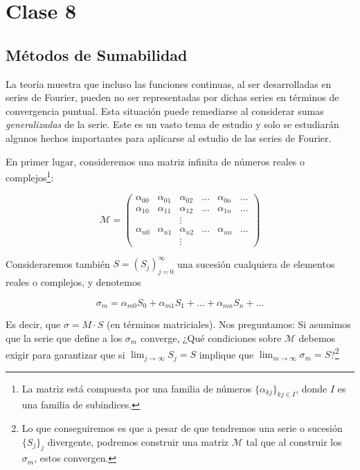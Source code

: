 \section{Clase 8}
\subsection{Métodos de Sumabilidad}

La teoría muestra que incluso las funciones continuas, al ser desarrolladas en series de Fourier, pueden no ser representadas por dichas series en términos de convergencia puntual. Esta situación puede remediarse al considerar sumas \textit{generalizadas} de la serie. Este es un vasto tema de estudio y solo se estudiarán algunos hechos importantes para aplicarse al estudio de las series de Fourier.

En primer lugar, consideremos una matriz infinita de números reales o complejos\footnote{La matriz está compuesta por una familia de números $\{ \alpha_{kj} \}_{kj \in I}$, donde $I$ es una familia de subíndices.}:

\[
    \mathcal{M} =
    \begin{pmatrix}
        \alpha_{00} & \alpha_{01} & \alpha_{02} & \dots & \alpha_{0n} & \dots \\
        \alpha_{10} & \alpha_{11} & \alpha_{12} & \dots & \alpha_{1n} & \dots \\
                    &             & \vdots      &       &             &       \\
        \alpha_{n0} & \alpha_{n1} & \alpha_{n2} & \dots & \alpha_{nn} & \dots \\
        &             & \vdots      &       &             &
    \end{pmatrix}
\]

Consideraremos también $S = (S_j)^{\infty}_{j=0}$ una sucesión cualquiera de elementos reales o complejos, y denotemos

\[
    \sigma_m = \alpha_{m0}S_0 + \alpha_{m1}S_1 + \dots + \alpha_{mn}S_n + \dots
\]

Es decir, que $\sigma = M \cdot S$ (en términos matriciales). Nos preguntamos: Si asumimos que la serie que define a los $\sigma_m$ converge, ¿Qué condiciones sobre $\mathcal{M}$ debemos exigir para garantizar que si $\lim_{j \to \infty} S_j = S$ implique que $\lim_{m \to \infty} \sigma_m = S$?\footnote{Lo que conseguiremos es que a pesar de que tendremos una serie o sucesión $\{S_j\}_j$ divergente, podremos construir una matriz $\mathcal{M}$ tal que al construir los $\sigma_m$, estos convergen.}

